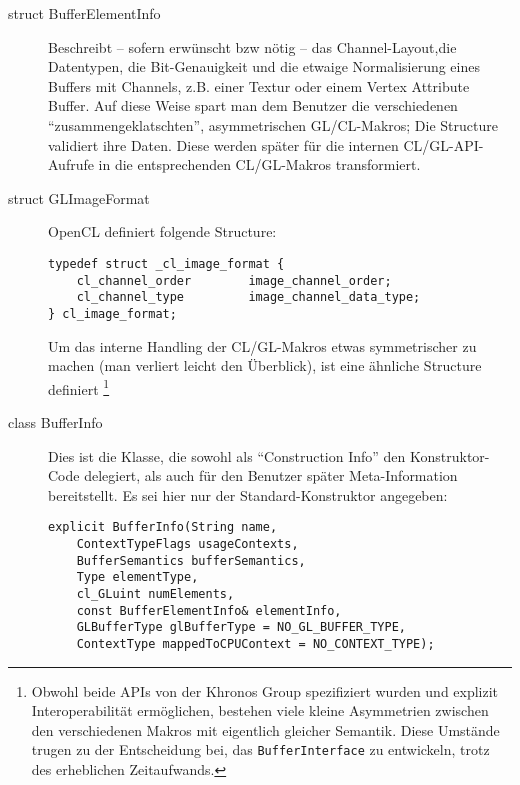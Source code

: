 \begin{description}
		\item[struct BufferElementInfo] 
		Beschreibt -- sofern erwünscht bzw nötig -- das Channel-Layout,die Datentypen, die Bit-Genauigkeit
		und die etwaige Normalisierung eines Buffers mit Channels, 
		z.B. einer Textur oder einem Vertex Attribute Buffer.
		Auf diese Weise spart man dem Benutzer die verschiedenen "`zusammengeklatschten"', asymmetrischen GL/CL-Makros;
		Die Structure validiert ihre Daten. Diese werden später für die internen CL/GL-API-Aufrufe in die
		entsprechenden CL/GL-Makros transformiert.
		
		\item[struct GLImageFormat]
		OpenCL definiert folgende Structure:
		
		\begin{lstlisting}		
typedef struct _cl_image_format {
    cl_channel_order        image_channel_order;
    cl_channel_type         image_channel_data_type;
} cl_image_format;	
		\end{lstlisting}
		
		Um das interne Handling der CL/GL-Makros etwas symmetrischer zu machen (man verliert leicht den Überblick),
		ist eine ähnliche Structure definiert 
		\footnote{Obwohl beide APIs von der Khronos Group spezifiziert wurden und explizit 	
			Interoperabilität ermöglichen, bestehen viele kleine Asymmetrien zwischen den verschiedenen Makros mit
			eigentlich gleicher Semantik. Diese Umstände trugen zu der Entscheidung bei, 
			das \lstinline|BufferInterface| zu entwickeln, trotz des erheblichen Zeitaufwands.}
		
		
		\item[class BufferInfo]
		Dies ist die Klasse, die sowohl als "`Construction Info"' den Konstruktor-Code delegiert, als auch für 
		den Benutzer später Meta-Information bereitstellt.
		Es sei hier nur der Standard-Konstruktor angegeben:
		
		\begin{lstlisting}	
explicit BufferInfo(String name,
	ContextTypeFlags usageContexts,
	BufferSemantics bufferSemantics,
	Type elementType,
	cl_GLuint numElements,
	const BufferElementInfo& elementInfo,
	GLBufferType glBufferType = NO_GL_BUFFER_TYPE,
	ContextType mappedToCPUContext = NO_CONTEXT_TYPE);
		\end{lstlisting}
		

\end{description}
